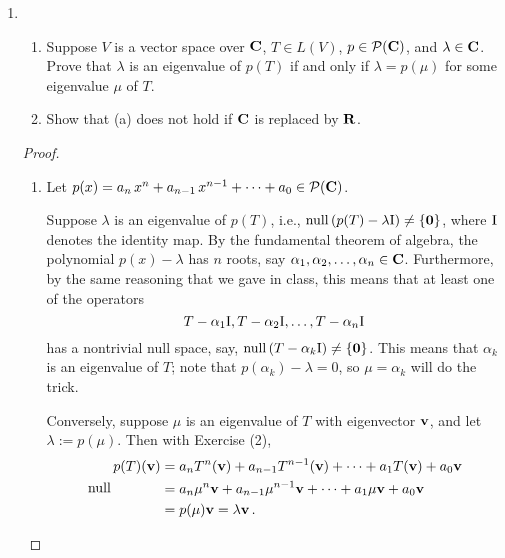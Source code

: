 \documentclass[11pt]{amsart}
\begin{document}
\begin{enumerate}[(1)]
\begin{proof}[Solution]
\begin{enumerate}

\item $V = \R^2$ with the standard basis, $T(x,y) = (y,x)$.
Then $T(1,0) = (0,1)$ and $T(0,1) = (1,0)$, so the matrix of $T$ contains only 0's on the diagonal.
Since $T^2$ is the identity, $T^{ -1 } = T$, and so $T$ is invertible.

\item $V = \R^2$ with the standard basis, $T(x,y) = (x+y,x+y)$.
Then $T(1,0) = (1,1) = T(0,1)$, so all of the entries (in particular, on the diagonal) of the matrix of $T$ are 1.
However, $\range(T) = \left\{ (x,y) \in \R^2 : \, x=y \right\}$ is one-dimensional, so $T$ is not invertible. \qedhere

\end{enumerate}
\end{proof}

\item
  \begin{enumerate}
  \item Suppose $V$ is a vector space over $\mathbf{C}$, $T \in L(V)$, $p \in \mathcal{P}(\mathbf{C})$, and $\lambda \in \mathbf{C}$. Prove that $\lambda$ is an eigenvalue of $p(T)$ if and only if $\lambda = p(\mu)$ for some eigenvalue $\mu$ of $T$.
  \item Show that (a) does not hold if $\mathbf{C}$ is replaced by $\mathbf{R}$.
  \end{enumerate}

\begin{proof}
\begin{enumerate}

\item Let $p(x) = a_n \, x^n + a_{ n-1 } \, x^{ n-1 } + \dots + a_0 \in \mathcal{P}(\mathbf{C})$.

Suppose $\lambda$ is an eigenvalue of $p(T)$, i.e., $\operatorname{null} \left( p(T) - \lambda \mathrm I \right) \ne \{\mathbf 0\}$, where $\mathrm I$ denotes the identity map.
By the fundamental theorem of algebra, the polynomial $p(x) - \lambda$ has $n$ roots, say $\alpha_1, \alpha_2, \dots, \alpha_n \in \mathbf{C}$.
Furthermore, by the same reasoning that we gave in class, this means that at least one of the operators
\[
  T - \alpha_1 \mathrm I, T - \alpha_2 \mathrm I, \dots, T - \alpha_n \mathrm I
\]
has a nontrivial null space, say, $\operatorname{null} \left( T - \alpha_k \mathrm I \right) \ne \{\mathbf 0\}$. This means that $\alpha_k$ is an eigenvalue of $T$; note that $p(\alpha_k) - \lambda = 0$, so $\mu = \alpha_k$ will do the trick.

Conversely, suppose $\mu$ is an eigenvalue of $T$ with eigenvector $\mathbf v$, and let $\lambda := p(\mu)$. Then with Exercise (2),
\begin{align*}
  p(T)(\v)
  &= a_n T^n(\v) + a_{ n-1 } T^{ n-1 } (\v) + \dots + a_1 T(\v) + a_0 \v \\
  &= a_n \mu^n \v + a_{ n-1 } \mu^{ n-1 } \v + \dots + a_1 \mu \v + a_0 \v \\
  &= p(\mu) \v = \lambda \v \, . \qedhere
\end{align*}


\end{enumerate}
\end{proof}
\end{enumerate}
\end{document}
